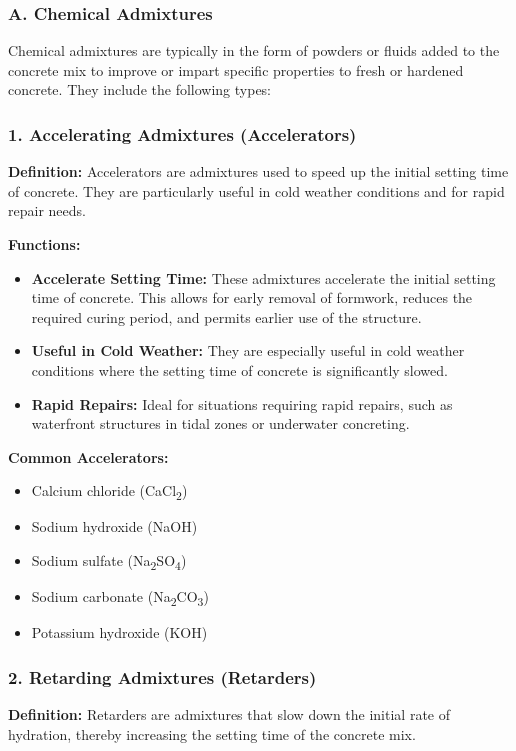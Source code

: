 \documentclass[a4paper,11pt]{book}
\begin{document}
\subsubsection{A. Chemical Admixtures}

Chemical admixtures are typically in the form of powders or fluids added to the concrete mix to improve or impart specific properties to fresh or hardened concrete. They include the following types:

\subsubsection*{1. Accelerating Admixtures (Accelerators)}
\textbf{Definition:} Accelerators are admixtures used to speed up the initial setting time of concrete. They are particularly useful in cold weather conditions and for rapid repair needs.

\textbf{Functions:}
\begin{itemize}
    \item \textbf{Accelerate Setting Time:} These admixtures accelerate the initial setting time of concrete. This allows for early removal of formwork, reduces the required curing period, and permits earlier use of the structure.
    \item \textbf{Useful in Cold Weather:} They are especially useful in cold weather conditions where the setting time of concrete is significantly slowed.
    \item \textbf{Rapid Repairs:} Ideal for situations requiring rapid repairs, such as waterfront structures in tidal zones or underwater concreting.
\end{itemize}

\textbf{Common Accelerators:}
\begin{itemize}
    \item Calcium chloride (CaCl\textsubscript{2})
    \item Sodium hydroxide (NaOH)
    \item Sodium sulfate (Na\textsubscript{2}SO\textsubscript{4})
    \item Sodium carbonate (Na\textsubscript{2}CO\textsubscript{3})
    \item Potassium hydroxide (KOH)
\end{itemize}

\subsubsection*{2. Retarding Admixtures (Retarders)}
\textbf{Definition:} Retarders are admixtures that slow down the initial rate of hydration, thereby increasing the setting time of the concrete mix.
\end{document}
